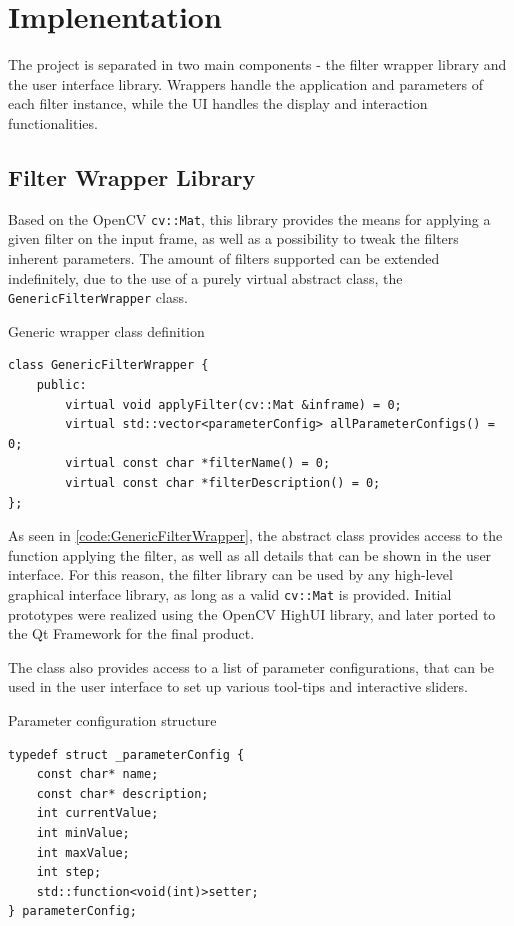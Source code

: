 \chapter{Implenentation}

The project is separated in two main components - the filter wrapper library and the user interface library.
Wrappers handle the application and parameters of each filter instance, while the UI handles the display
and interaction functionalities.

\section{Filter Wrapper Library}

Based on the OpenCV \verb|cv::Mat|, this library provides the means for applying a given filter on the input
frame, as well as a possibility to tweak the filters inherent parameters. The amount of filters supported can
be extended indefinitely, due to the use of a purely virtual abstract class, the \verb|GenericFilterWrapper|
class.

\begin{code}
	\caption{Generic wrapper class definition}
	\label{code:GenericFilterWrapper}
	\begin{lstlisting}
class GenericFilterWrapper {
    public:
        virtual void applyFilter(cv::Mat &inframe) = 0;
        virtual std::vector<parameterConfig> allParameterConfigs() = 0;
        virtual const char *filterName() = 0;
        virtual const char *filterDescription() = 0;
};
    \end{lstlisting}
\end{code}

As seen in \cref{code:GenericFilterWrapper}, the abstract class provides access to the function
applying the filter, as well as all details that can be shown in the user interface. For this reason,
the filter library can be used by any high-level graphical interface library, as long as a valid
\verb|cv::Mat| is provided. Initial prototypes were realized using the OpenCV HighUI library, and later
ported to the Qt Framework for the final product.

The class also provides access to a list of parameter configurations, that can be used in the user
interface to set up various tool-tips and interactive sliders.

\begin{code}
	\caption{Parameter configuration structure}
	\label{code:parameterConfig}
	\begin{lstlisting}
typedef struct _parameterConfig {
    const char* name;
    const char* description;
    int currentValue;
    int minValue;
    int maxValue;
    int step;
    std::function<void(int)>setter;
} parameterConfig;
    \end{lstlisting}
\end{code}

